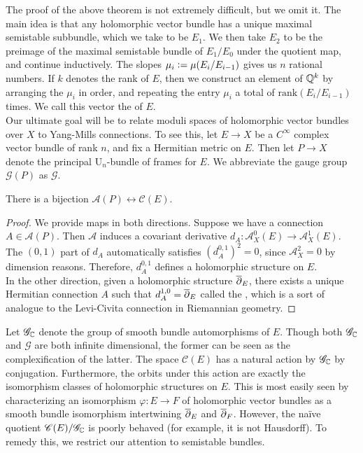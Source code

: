 %
The proof of the above theorem is not extremely difficult, but we omit it.
The main idea is that any holomorphic vector bundle has a unique
maximal semistable subbundle, which we take to be $E_1$. We then take
$E_2$ to be the preimage of the maximal semistable bundle of $E_1/E_0$ under
the quotient map, and continue inductively. The slopes
$\mu_i \vcentcolon= \mu(E_i/E_{i-1})$ gives us $n$ rational numbers. If $k$ denotes
the rank of $E$, then we construct an element of $\mathbb{Q}^k$ by arranging
the $\mu_i$ in order, and repeating the entry $\mu_i$ a total of
$\mathrm{rank}(E_i/E_{i-1})$ times. We call this vector the
 of $E$. \\

Our ultimate goal will be to relate moduli spaces of holomorphic vector
bundles over $X$ to Yang-Mills connections. To see this, let $E \to X$ be
a $C^\infty$ complex vector bundle of rank $n$, and fix a Hermitian metric
on $E$. Then let $P \to X$ denote the principal $\mathrm{U}_n$-bundle of frames
for $E$. We abbreviate the gauge group $\mathscr{G}(P)$ as $\mathscr{G}$.
%
\begin{prop}
There is a bijection $\mathscr{A}(P) \leftrightarrow \mathscr{C}(E)$.
\end{prop}
%
\begin{proof}
We provide maps in both directions. Suppose we have a connection
$A \in \mathscr{A}(P)$. Then $\mathcal{A}$ induces a covariant derivative
$d_A : \mathcal{A}^0_X(E) \to \mathcal{A}^1_X(E)$. The $(0,1)$ part of $d_A$
automatically satisfies $(d_A^{0,1})^2 = 0$, since $\mathcal{A}^2_X = 0$ by
dimension reasons. Therefore, $d_A^{0,1}$ defines a holomorphic structure
on $E$. \\

In the other direction, given a holomorphic structure $\overline{\partial}_E$,
there exists a unique Hermitian connection $A$ such that $d_A^{1,0} = \overline{\partial}_E$
called the , which is a sort of analogue to the Levi-Civita
connection in Riemannian geometry.
\end{proof}
%
Let $\mathscr{G}_{\mathbb{C}}$ denote the group of smooth bundle automorphisms of $E$.
Though both $\mathscr{G}_{\mathbb{C}}$ and $\mathscr{G}$ are both infinite dimensional,
the former can be seen as the complexification of the latter. The space
$\mathscr{C}(E)$ has a natural action by $\mathscr{G}_{\mathbb{C}}$ by conjugation.
Furthermore, the orbits under this action are exactly the isomorphism
classes of holomorphic structures on $E$. This is most easily seen by
characterizing an isomorphism $\varphi : E \to F$ of holomorphic vector bundles
as a smooth bundle isomorphism intertwining $\overline{\partial}_E$ and $\overline{\partial}_F$. However,
the na\"ive quotient $\mathscr{C}(E)/\mathscr{G}_{\mathbb{C}}$ is poorly behaved
(for example, it is not Hausdorff). To remedy this, we restrict our attention
to semistable bundles. \\

